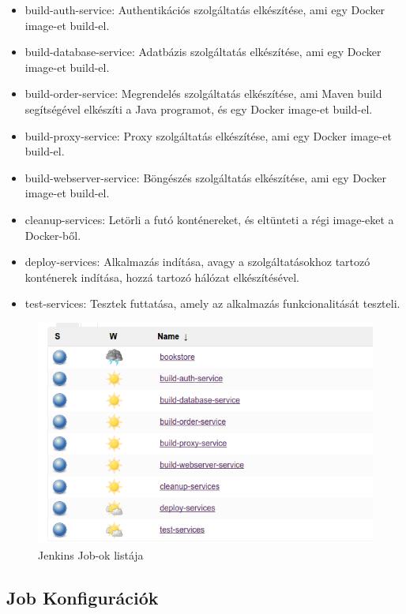 \documentclass[11pt,magyar,a4paper,twoside,]{report}
\providecommand{\tightlist}{%
  \setlength{\itemsep}{0pt}\setlength{\parskip}{0pt}}
\let\Oldincludegraphics\includegraphics
\renewcommand{\includegraphics}[1]{
\begin{adjustbox}{max size={\textwidth}{\textheight}}
    \Oldincludegraphics[scale=0.6]{#1}%
\end{adjustbox}
}
\begin{document}
\begin{itemize}
\tightlist
\item
  build-auth-service: Authentikációs szolgáltatás elkészítése, ami egy
  Docker image-et build-el.
\item
  build-database-service: Adatbázis szolgáltatás elkészítése, ami egy
  Docker image-et build-el.
\item
  build-order-service: Megrendelés szolgáltatás elkészítése, ami Maven
  build segítségével elkészíti a Java programot, és egy Docker image-et
  build-el.
\item
  build-proxy-service: Proxy szolgáltatás elkészítése, ami egy Docker
  image-et build-el.
\item
  build-webserver-service: Böngészés szolgáltatás elkészítése, ami egy
  Docker image-et build-el.
\item
  cleanup-services: Letörli a futó konténereket, és eltünteti a régi
  image-eket a Docker-ből.
\item
  deploy-services: Alkalmazás indítása, avagy a szolgáltatásokhoz
  tartozó konténerek indítása, hozzá tartozó hálózat elkészítésével.
\item
  test-services: Tesztek futtatása, amely az alkalmazás funkcionalitását
  teszteli.
\end{itemize}

\begin{figure}[H]
\centering
\includegraphics{img/job-view.png}
\caption{Jenkins Job-ok listája}
\end{figure}

\subsection{Job Konfigurációk}\label{job-konfiguruxe1ciuxf3k}
\end{document}
